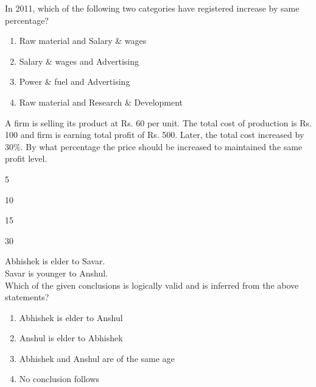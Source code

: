 In 2011, which of the following two categories have registered increase by same percentage?
\begin{enumerate}
\item Raw material and Salary \& wages
\item Salary \& wages and Advertising
\item Power \& fuel and Advertising
\item Raw material and Research \& Development
\end{enumerate}
\item A firm is selling its product at Rs. 60 per unit. The total cost of production is Rs. 100 and firm is
earning total profit of Rs. 500. Later, the total cost increased by 30\%. By what percentage the price
should be increased to maintained the same profit level.
\begin{enumerate}
\begin{multicols}{4}
\item 5
\item 10
\item 15
\item 30
\end{multicols}
\end{enumerate}
\item Abhishek is elder to Savar.\\
Savar is younger to Anshul.\\
Which of the given conclusions is logically valid and is inferred from the above
statements?
\begin{enumerate}
\item Abhishek is elder to Anshul
\item Anshul is elder to Abhishek
\item Abhishek and Anshul are of the same age
\item No conclusion follows
\end{enumerate}
